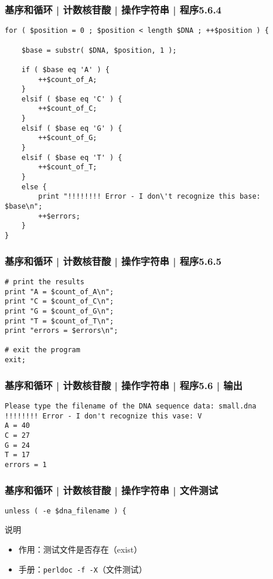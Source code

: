 \begin{frame}[fragile]
  \frametitle{基序和循环 | 计数核苷酸 | 操作字符串 | 程序5.6.4}
\begin{lstlisting}[firstnumber=45,basicstyle=\scriptsize\tt,numberstyle=\tiny]
for ( $position = 0 ; $position < length $DNA ; ++$position ) {

    $base = substr( $DNA, $position, 1 );

    if ( $base eq 'A' ) {
        ++$count_of_A;
    }
    elsif ( $base eq 'C' ) {
        ++$count_of_C;
    }
    elsif ( $base eq 'G' ) {
        ++$count_of_G;
    }
    elsif ( $base eq 'T' ) {
        ++$count_of_T;
    }
    else {
        print "!!!!!!!! Error - I don\'t recognize this base: $base\n";
        ++$errors;
    }
}
\end{lstlisting}
\end{frame}

\begin{frame}[fragile]
  \frametitle{基序和循环 | 计数核苷酸 | 操作字符串 | 程序5.6.5}
\begin{lstlisting}[firstnumber=67]
# print the results
print "A = $count_of_A\n";
print "C = $count_of_C\n";
print "G = $count_of_G\n";
print "T = $count_of_T\n";
print "errors = $errors\n";

# exit the program
exit;
\end{lstlisting}
\end{frame}

\begin{frame}[fragile]
  \frametitle{基序和循环 | 计数核苷酸 | 操作字符串 | 程序5.6 | 输出}
\begin{lstlisting}
Please type the filename of the DNA sequence data: small.dna
!!!!!!!! Error - I don't recognize this vase: V
A = 40
C = 27
G = 24
T = 17
errors = 1
\end{lstlisting}
\end{frame}

\begin{frame}[fragile]
  \frametitle{基序和循环 | 计数核苷酸 | 操作字符串 | \alert{文件测试}}
\begin{lstlisting}
unless ( -e $dna_filename ) {
\end{lstlisting}
\pause
\begin{block}{说明}
  \begin{itemize}
    \item 作用：测试文件是否存在（exist）
    \item 手册：\verb|perldoc -f -X|（文件测试）
  \end{itemize}
\end{block}
\end{frame}

